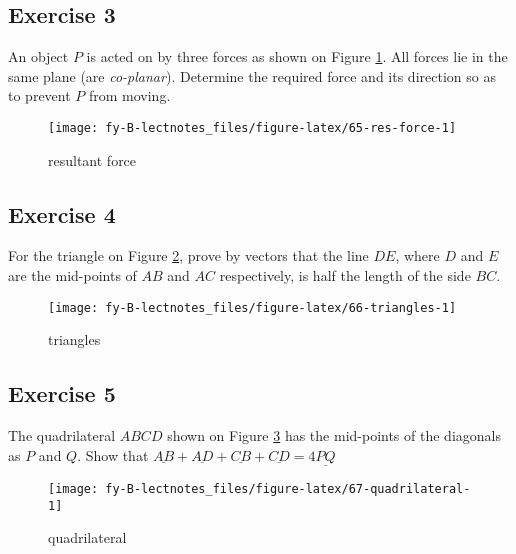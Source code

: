 \documentclass[
  11pt,
  oneside]{book}
\newcommand{\slide}{}
\theoremstyle{definition}
\theoremstyle{definition}
\theoremstyle{definition}
\theoremstyle{definition}
\theoremstyle{remark}
\begin{document}
\slide

\subsection*{Exercise 3}\label{exercise-3-10}

An object \(P\) is acted on by three forces as shown on Figure \ref{fig:65-res-force}. All forces lie in the same plane (are \emph{co-planar}). Determine the required force and its direction so as to prevent \(P\) from moving.

\begin{figure}

{\centering \texttt{[image: fy-B-lectnotes\_files/figure-latex/65-res-force-1]} 

}

\caption{resultant force}\label{fig:65-res-force}
\end{figure}
\slide

\subsection*{Exercise 4}\label{exercise-4-8}

For the triangle on Figure \ref{fig:66-triangles}, prove by vectors that the line \(DE\), where \(D\) and \(E\) are the mid-points of \(AB\) and \(AC\) respectively, is half the length of the side \(BC\).

\begin{figure}

{\centering \texttt{[image: fy-B-lectnotes\_files/figure-latex/66-triangles-1]} 

}

\caption{triangles}\label{fig:66-triangles}
\end{figure}

\slide

\subsection*{Exercise 5}\label{exercise-5-6}

The quadrilateral \(ABCD\) shown on Figure \ref{fig:67-quadrilateral} has the mid-points of the diagonals as \(P\) and \(Q\). Show that \(\underline{AB}+\underline{AD}+\underline{CB}+\underline{CD} = 4\underline{PQ}\)

\begin{figure}

{\centering \texttt{[image: fy-B-lectnotes\_files/figure-latex/67-quadrilateral-1]} 

}

\caption{quadrilateral}\label{fig:67-quadrilateral}
\end{figure}
\end{document}
